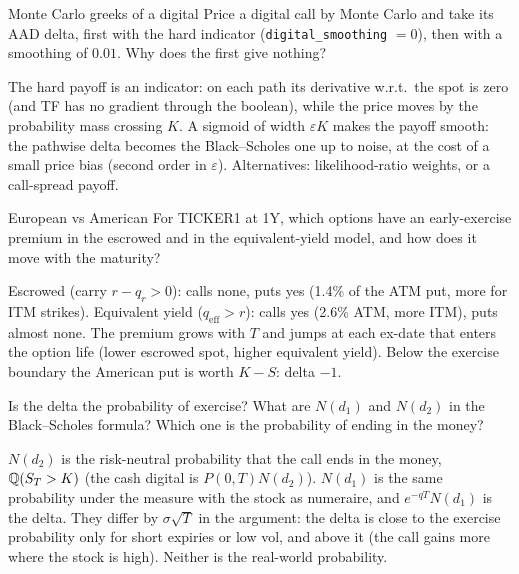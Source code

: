 \begin{question}{\Practice {}}{Monte Carlo greeks of a digital}
Price a digital call by Monte Carlo and take its AAD delta, first with the hard indicator
(\texttt{digital\_smoothing} $= 0$), then with a smoothing of $0.01$. Why does the first give nothing? 
\end{question}
\begin{answer}
The hard payoff is an indicator: on each path its derivative w.r.t.\ the spot is zero (and TF has no gradient
through the boolean), while the price moves by the probability mass crossing $K$. A sigmoid of width $\varepsilon K$
makes the payoff smooth: the pathwise delta becomes the Black--Scholes one up to noise, at the cost of a small
price bias (second order in $\varepsilon$). Alternatives: likelihood-ratio weights, or a call-spread payoff.
\end{answer}

\begin{question}{\Practice {}}{European vs American}
For TICKER1 at 1Y, which options have an early-exercise premium in the escrowed and in the equivalent-yield model,
and how does it move with the maturity? 
\end{question}
\begin{answer}
Escrowed (carry $r - q_r > 0$): calls none, puts yes (1.4\% of the ATM put, more for ITM strikes). Equivalent yield
($q_{\text{eff}} > r$): calls yes (2.6\% ATM, more ITM), puts almost none. The premium grows with $T$ and jumps at each
ex-date that enters the option life (lower escrowed spot, higher equivalent yield). Below the exercise boundary the
American put is worth $K - S$: delta $-1$.
\end{answer}

\begin{question}{\Theory {}}{Is the delta the probability of exercise?}
What are $N(d_1)$ and $N(d_2)$ in the Black--Scholes formula? Which one is the probability of ending in the money?
\end{question}
\begin{answer}
$N(d_2)$ is the risk-neutral probability that the call ends in the money, $\mathbb{Q}(S_T > K)$ (the cash digital is
$P(0,T)N(d_2)$). $N(d_1)$ is the same probability under the measure with the stock as numeraire, and $e^{-qT}N(d_1)$
is the delta. They differ by $\sigma\sqrt T$ in the argument: the delta is close to the exercise probability only for
short expiries or low vol, and above it (the call gains more where the stock is high). Neither is the real-world
probability.
\end{answer}

